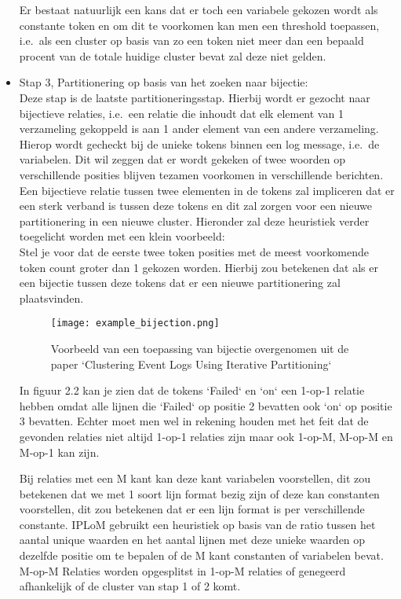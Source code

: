 \begin{itemize}
    Er bestaat natuurlijk een kans dat er toch een variabele gekozen wordt als constante token en om dit te voorkomen kan men een threshold toepassen, i.e.\ als een cluster op basis van zo een token niet meer dan een bepaald procent van de totale huidige cluster bevat zal deze niet gelden.\\
    \item Stap 3, Partitionering op basis van het zoeken naar bijectie:\\
    Deze stap is de laatste partitioneringsstap. Hierbij wordt er gezocht naar bijectieve relaties, i.e.\ een relatie die inhoudt dat elk element van 1 verzameling gekoppeld is aan 1 ander element van een andere verzameling. Hierop wordt gecheckt bij de unieke tokens binnen een log message, i.e.\ de variabelen. Dit wil zeggen dat er wordt gekeken of twee woorden op verschillende posities blijven tezamen voorkomen in verschillende berichten. Een bijectieve relatie tussen twee elementen in de tokens zal impliceren dat er een sterk verband is tussen deze tokens en dit zal zorgen voor een nieuwe partitionering in een nieuwe cluster. Hieronder zal deze heuristiek verder toegelicht worden met een klein voorbeeld:\\
    Stel je voor dat de eerste twee token posities met de meest voorkomende token count groter dan 1 gekozen worden. Hierbij zou betekenen dat als er een bijectie tussen deze tokens dat er een nieuwe partitionering zal plaatsvinden. 
    \begin{figure}[!htp]
        \texttt{[image: example\_bijection.png]}
        \caption{Voorbeeld van een toepassing van bijectie overgenomen uit de paper `Clustering Event Logs Using Iterative Partitioning`~\autocite{makanju2009clustering}}
    \end{figure}
    In figuur 2.2 kan je zien dat de tokens `Failed` en `on` een 1-op-1 relatie hebben omdat alle lijnen die `Failed` op positie 2 bevatten ook `on` op positie 3 bevatten. 
    Echter moet men wel in rekening houden met het feit dat de gevonden relaties niet altijd 1-op-1 relaties zijn maar ook 1-op-M, M-op-M en M-op-1 kan zijn. 
    
    Bij relaties met een M kant kan deze kant variabelen voorstellen, dit zou betekenen dat we met 1 soort lijn format bezig zijn of deze kan constanten voorstellen, dit zou betekenen dat er een lijn format is per verschillende constante. IPLoM gebruikt een heuristiek op basis van de ratio tussen het aantal unique waarden en het aantal lijnen met deze unieke waarden op dezelfde positie om te bepalen of de M kant constanten of variabelen bevat. M-op-M Relaties worden opgesplitst in 1-op-M relaties of genegeerd afhankelijk of de cluster van stap 1 of 2 komt. 
    

\end{itemize}

